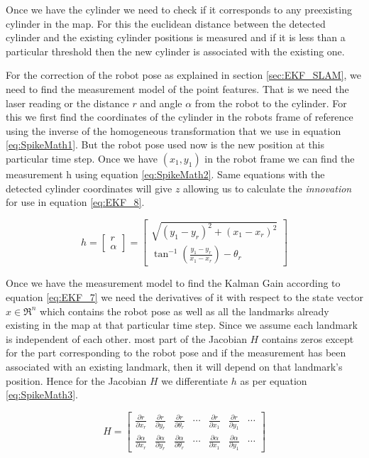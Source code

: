 Once we have the cylinder we need to check if it corresponds to any preexisting cylinder in the map. For this the euclidean distance between the detected cylinder and the existing cylinder positions is measured and if it is less than a particular threshold then the new cylinder is associated with the existing one. 

For the correction of the robot pose as explained in section \ref{sec:EKF_SLAM}, we need to find the measurement model of the point features. That is we need the laser reading or the distance $ r $ and angle $ \alpha $ from the robot to the cylinder. For this we first find the coordinates of the cylinder in the robots frame of reference using the inverse of the homogeneous transformation that we use in equation \ref{eq:SpikeMath1}. But the robot pose used now is the new position at this particular time step. Once we have $ (x_1,y_1) $ in the robot frame we can find the measurement h using equation \ref{eq:SpikeMath2}. Same equations with the detected cylinder coordinates will give $ z $ allowing us to calculate the \textit{innovation} for use in equation \ref{eq:EKF_8}. 

\begin{equation}
	\label{eq:SpikeMath2}
	h=\begin{bmatrix}
	r\\\alpha
	\end{bmatrix}=
	\begin{bmatrix}
	\sqrt{(y_1-y_r)^2+(x_1-x_r)^2} \\
	\tan^{-1}\left(\frac{y_1-y_r}{x_1-x_r}\right)-\theta_r
	\end{bmatrix}
\end{equation}

Once we have the measurement model to find the Kalman Gain according to equation \ref{eq:EKF_7} we need the derivatives of it with respect to the state vector $ x \in \Re^n $ which contains the robot pose as well as all the landmarks already existing in the map at that particular time step. Since we assume each landmark is independent of each other. most part of the Jacobian $ H $ contains zeros except for the part corresponding to the robot pose and if the measurement has been associated with an existing landmark, then it will depend on that landmark's position. Hence for the Jacobian $ H $ we differentiate $ h $ as per equation \ref{eq:SpikeMath3}. 

\begin{equation}
\label{eq:SpikeMath3}
	H = 
	\begin{bmatrix}
	\frac{\partial r}{\partial x_r} & \frac{\partial r}{\partial y_r} & \frac{\partial r}{\partial \theta_r} & \cdots & \frac{\partial r}{\partial x_1} & \frac{\partial r}{\partial y_1} & \cdots \\
	\frac{\partial \alpha}{\partial x_r} & \frac{\partial \alpha}{\partial y_r} & \frac{\partial \alpha}{\partial \theta_r} & \cdots & \frac{\partial \alpha}{\partial x_1} & \frac{\partial \alpha}{\partial y_1} & \cdots 
	\end{bmatrix}
\end{equation}

